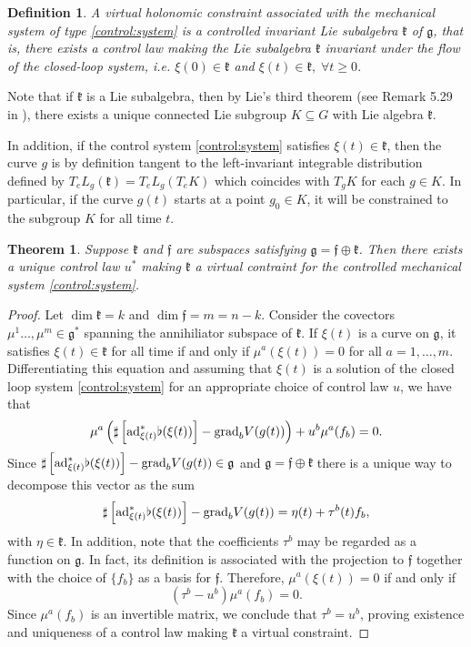\documentclass[letterpaper, 10 pt, conference]{ieeeconf}
\newtheorem{theorem}{Theorem}
\newtheorem{definition}{Definition}
\newcommand{\g}{\mathfrak{g}}
\newcommand{\grad}{\normalfont{\text{grad}}}
\begin{document}
\begin{definition}
   A virtual holonomic constraint associated with the mechanical system of type \eqref{control:system} is a controlled invariant Lie subalgebra $\mathfrak{k}$ of $\g$, that is, there exists a control law  making the Lie subalgebra $\mathfrak{k}$ invariant under the flow of the closed-loop system, i.e. $\xi(0)\in\mathfrak{k}$ and $\xi(t)\in\mathfrak{k}, \; \forall t\geq 0$.
    
\end{definition}

Note that if $\mathfrak{k}$ is a Lie subalgebra, then by Lie's third theorem (see Remark 5.29 in \cite{bullo}), there exists a unique connected Lie subgroup $K\subseteq G$ with Lie algebra $\mathfrak{k}$.

In addition, if the control system \eqref{control:system} satisfies $\xi(t)\in\mathfrak{k}$, then the curve $g$ is  by definition tangent to the left-invariant integrable distribution defined by $T_e L_g(\mathfrak{k})=T_e L_g(T_{e}K)$ which coincides with $T_g K$ for each $g\in K$. In particular, if the curve $g(t)$ starts at a point $g_0\in K$, it will be constrained to the subgroup $K$ for all time $t$.




\begin{theorem}\label{maintheorem}
    Suppose $\mathfrak{k}$ and $\mathfrak{f}$ are subspaces satisfying $\g = \mathfrak{f}\oplus \mathfrak{k} $. Then there exists a unique control law $u^{*}$ making $\mathfrak{k}$ a virtual contraint for the controlled mechanical system \eqref{control:system}.
\end{theorem}

\begin{proof}
    Let $\dim \mathfrak{k} = k$ and $\dim \mathfrak{f}=m=n-k$. Consider the covectors $\mu^{1}\dots, \mu^{m} \in \g^{*}$ spanning the annihiliator subspace of $\mathfrak{k}$. If $\xi(t)$ is a curve on $\g$, it satisfies  $\xi(t)\in \mathfrak{k}$ for all time if and only if $\mu^{a}(\xi(t))= 0$ for all $a=1,\dots, m$. Differentiating this equation and assuming that $\xi(t)$ is a solution of the closed loop system \eqref{control:system} for an appropriate choice of control law $u$, we have that
    $$\mu^{a}\left( \sharp \left[ \text{ad}^{*}_{\xi(t)}\flat(\xi(t))\right] - \grad_{b} V(g(t)) \right) + u^{b}\mu^{a}(f_{b}) = 0.$$
    Since $\sharp \left[ \text{ad}^{*}_{\xi(t)}\flat(\xi(t))\right]- \grad_{b} V(g(t)) \in \g$ and $\g = \mathfrak{f}\oplus \mathfrak{k} $ there is a unique way to decompose this vector as the sum
    $$\sharp \left[ \text{ad}^{*}_{\xi(t)}\flat(\xi(t))\right]- \grad_{b} V(g(t)) = \eta(t) + \tau^{b}(t)f_{b},$$
    with $\eta \in \mathfrak{k}$. In addition, note that the coefficients $\tau^{b}$ may be regarded as a function on $\g$. In fact, its definition is associated with the projection to $\mathfrak{f}$ together with the choice of $\{f_{b}\}$ as a basis for $\mathfrak{f}$. Therefore, $\mu^{a}(\xi(t))=0$ if and only if
    $$(\tau^{b}-u^{b}) \mu^{a}(f_{b})=0.$$
    Since $\mu^{a}(f_{b})$ is an invertible matrix, we conclude that $\tau^{b}=u^{b}$, proving existence and uniqueness of a control law making $\mathfrak{k}$ a virtual constraint.
\end{proof}
\end{document}
